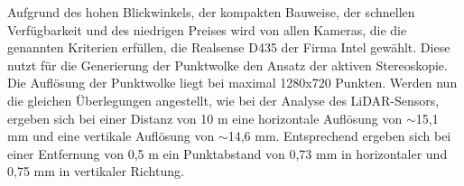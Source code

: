 %

Aufgrund des hohen Blickwinkels, der kompakten Bauweise, der schnellen Verfügbarkeit und des niedrigen Preises wird von allen Kameras, die die genannten Kriterien erfüllen, die Realsense D435 der Firma Intel gewählt. Diese nutzt für die Generierung der Punktwolke den Ansatz der aktiven Stereoskopie. Die Auflösung der Punktwolke liegt bei maximal 1280x720 Punkten. Werden nun die gleichen Überlegungen angestellt, wie bei der Analyse des LiDAR-Sensors, ergeben sich bei einer Distanz von 10 m eine horizontale Auflösung von $\sim$15,1 mm und eine vertikale Auflösung von $\sim$14,6 mm. Entsprechend ergeben sich bei einer Entfernung von 0,5 m ein Punktabstand von 0,73 mm in horizontaler und 0,75 mm in vertikaler Richtung. 


